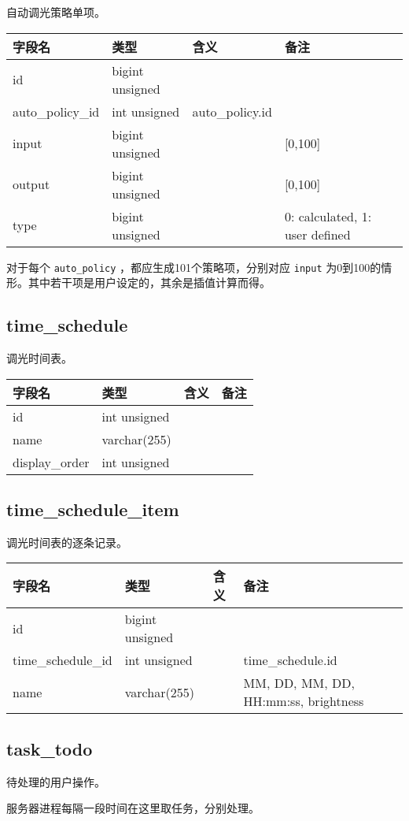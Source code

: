 自动调光策略单项。

\begin{longtabu}[c]{@{}lXXX@{}}
\toprule
字段名 & 类型 & 含义 & 备注\tabularnewline
\midrule
\endhead
id & bigint unsigned & &\tabularnewline
auto\_policy\_id & int unsigned & auto\_policy.id &\tabularnewline
input & bigint unsigned & & {[}0,100{]}\tabularnewline
output & bigint unsigned & & {[}0,100{]}\tabularnewline
type & bigint unsigned & & 0: calculated, 1: user defined\tabularnewline
\bottomrule
\end{longtabu}

对于每个 \texttt{auto\_policy} ，都应生成101个策略项，分别对应
\texttt{input}
为0到100的情形。其中若干项是用户设定的，其余是插值计算而得。

\subsection{time\_schedule}\label{timeux5fschedule}

调光时间表。

\begin{longtabu}[c]{@{}lXXX@{}}
\toprule
字段名 & 类型 & 含义 & 备注\tabularnewline
\midrule
\endhead
id & int unsigned & &\tabularnewline
name & varchar(255) & &\tabularnewline
display\_order & int unsigned & &\tabularnewline
\bottomrule
\end{longtabu}

\subsection{time\_schedule\_item}\label{timeux5fscheduleux5fitem}

调光时间表的逐条记录。

\begin{longtabu}[c]{@{}lXXX@{}}
\toprule
字段名 & 类型 & 含义 & 备注\tabularnewline
\midrule
\endhead
id & bigint unsigned & &\tabularnewline
time\_schedule\_id & int unsigned & & time\_schedule.id\tabularnewline
name & varchar(255) & & MM, DD, MM, DD, HH:mm:ss,
brightness\tabularnewline
\bottomrule
\end{longtabu}

\subsection{task\_todo}\label{taskux5ftodo}

待处理的用户操作。

服务器进程每隔一段时间在这里取任务，分别处理。

